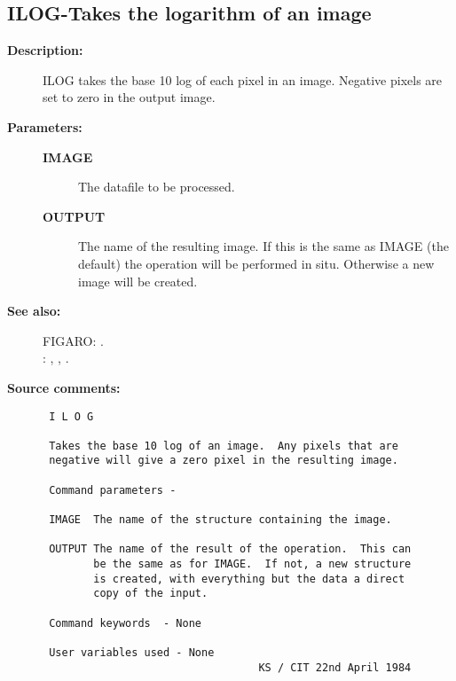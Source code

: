 \subsection{ILOG-\label{ILOG}Takes the logarithm of an image}
\begin{description}

\item [{\bf Description:}]
 ILOG takes the base 10 log of each pixel in an image.
 Negative pixels are set to zero in the output image.

\item [{\bf Parameters:}]
\begin{description}
\item [{\bf IMAGE}]
 The datafile to be processed.
\item [{\bf OUTPUT}]
 The name of the resulting image.  If this is the
 same as IMAGE (the default) the operation will be
 performed in situ.  Otherwise a new image will be
 created.
\end{description}

\item [{\bf See also:}]
FIGARO: .\\
: , , .\\

\item [{\bf Source comments:}]
\begin{verbatim}
 I L O G

 Takes the base 10 log of an image.  Any pixels that are
 negative will give a zero pixel in the resulting image.

 Command parameters -

 IMAGE  The name of the structure containing the image.

 OUTPUT The name of the result of the operation.  This can
        be the same as for IMAGE.  If not, a new structure
        is created, with everything but the data a direct
        copy of the input.

 Command keywords  - None

 User variables used - None
                                  KS / CIT 22nd April 1984
\end{verbatim}
\end{description}
